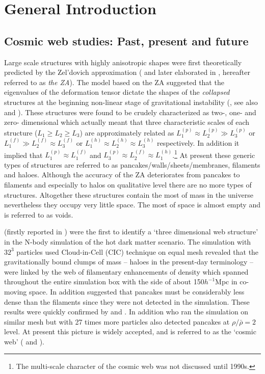 
\chapter{General Introduction}

\section{Cosmic web studies: Past, present and future}

Large scale structures with  highly anisotropic shapes were first theoretically predicted by the Zel'dovich approximation (\citealt{Zeldovich1970} and later elaborated in \citealt{Shandarin1989}, hereafter referred to as {\it the ZA}). The model based on the ZA suggested that the eigenvalues of the deformation tensor dictate the shapes of the {\it collapsed} structures at the beginning non-linear stage of gravitational instability (\citealt{Arnold1982}, see also \citealt{Shandarin1989} and \citealt{Hidding2014}). These structures were found to be crudely  characterized as two-, one- and zero- dimensional  which actually meant that three characteristic scales of each structure ($L_1\ge L_2\ge L_3$) are approximately related as  $L_1^{(p)} \approx L_2^{(p)} \gg L_3^{(p)}$ or $L_1^{(f)} \gg L_2^{(f)} \approx L_3^{(f)}$ or $L_1^{(h)} \approx L_2^{(h)}  \approx L_3^{(h)} $ respectively.  In addition it implied that $L_1^{(p)} \approx L_1^{(f)}$ and $L_3^{(p)} \approx L_2^{(f)} \approx L_1^{(h)}$.\footnote{The multi-scale character of the cosmic web was not discussed until 1990s.} At present these generic types of structures are referred to as pancakes/walls/sheets/membranes, filaments and haloes. Although the accuracy of the ZA deteriorates from pancakes to  filaments and especially to halos on qualitative level  there are no more types of  structures. Altogether these structures contain the most of mass in the universe nevertheless they occupy  very little space. The most of space is almost empty  and is referred to as voids.

\cite{Klypin1983a} (firstly reported  in \citealt{Shandarin1983}) were the first to identify a `three dimensional web structure' in the N-body simulation of the hot dark matter scenario. The simulation with $32^3$ particles used Cloud-in-Cell (CIC) technique on equal mesh revealed  that the gravitationally bound clumps of mass -- haloes in the present-day terminology --  were linked by the web of filamentary enhancements of density which spanned throughout the entire simulation box with the side of about 150$h^{-1}$Mpc in co-moving space. In addition \cite{Klypin1983a}  suggested that pancakes must be considerably less dense than the filaments since they were not detected in the simulation. These  results were quickly confirmed by \cite{Centrella1983} and \cite{Frenk1983}. In addition \cite{Centrella1983} who ran the simulation on similar mesh but with 27 times more particles also detected pancakes at $\rho/\bar{\rho} = 2$ level. At present this picture is widely accepted, and is referred to as the `cosmic web' (\citealt{Bond1996} and \citealt{Weygaert2008c}). 

